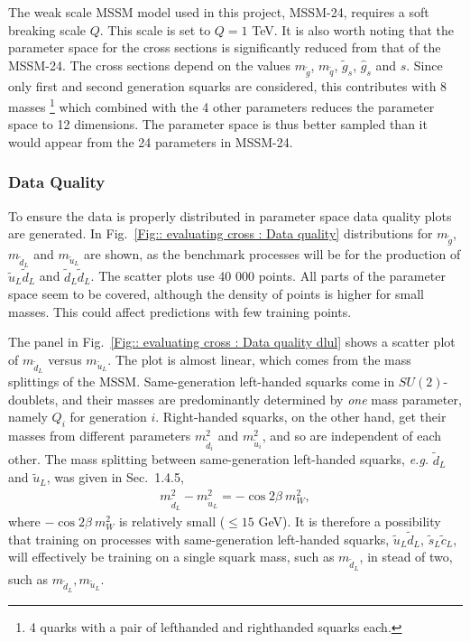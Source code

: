 \documentclass[twoside,english]{uiofysmaster}
\begin{document}
The weak scale MSSM model used in this project, MSSM-24, requires a soft breaking scale $Q$. This scale is set to $Q=1$ TeV. It is also worth noting that the parameter space for the cross sections is significantly reduced from that of the MSSM-24. The cross sections depend on the values $m_{\tilde{g}}$, $m_{\tilde{q}}$, $\tilde{g}_s$, $\hat{g}_s$ and $s$. Since only first and second generation squarks are considered, this contributes with 8 masses \footnote{4 quarks with a pair of lefthanded and righthanded squarks each.} which combined with the 4 other parameters reduces the parameter space to 12 dimensions. The parameter space is thus better sampled than it would appear from the 24 parameters in MSSM-24.

\subsubsection{Data Quality}




To ensure the data is properly distributed in parameter space data quality plots are generated. In Fig.~\ref{Fig:: evaluating cross : Data quality} distributions for $m_{\tilde{g}}$, $m_{\tilde{d}_L}$ and $m_{\tilde{u}_L}$ are shown, as the benchmark processes will be for the production of $\tilde{u}_L \tilde{d}_L$ and $\tilde{d}_L \tilde{d}_L$. The scatter plots use 40 000 points. All parts of the parameter space seem to be covered, although the density of points is higher for small masses. This could affect predictions with few training points.

The panel in Fig.~\ref{Fig:: evaluating cross : Data quality dlul} shows a scatter plot of $m_{\tilde{d}_L}$ versus $m_{\tilde{u}_L}$. The plot is almost linear, which comes from the mass splittings of the MSSM. Same-generation left-handed squarks come in $SU(2)$-doublets, and their masses are predominantly determined by \textit{one} mass parameter, namely $Q_i$ for generation $i$. Right-handed squarks, on the other hand, get their masses from different parameters $m_{\tilde{d}_i}^2$ and $m_{\tilde{u}_i}^2$, and so are independent of each other. The mass splitting between same-generation left-handed squarks, \textit{e.g.} $\tilde{d}_L$ and $\tilde{u}_L$, was given in Sec.~1.4.5,
\begin{align*}
m_{\tilde{d}_L}^2 - m_{\tilde{u}_L}^2 = - \cos 2 \beta ~m_W^2,
\end{align*}
where $- \cos 2 \beta~m_W^2$ is relatively small ($\leq 15$ GeV). It is therefore a possibility that training on processes with same-generation left-handed squarks, $\tilde{u}_L \tilde{d}_L$, $\tilde{s}_L \tilde{c}_L$, will effectively be training on a single squark mass, such as $m_{\tilde{d}_L}$, in stead of two, such as $m_{\tilde{d}_L}, m_{\tilde{u}_L}$. 
\end{document}
